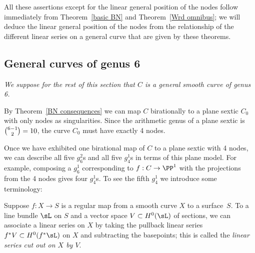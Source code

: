All these assertions except for the linear general position of the nodes
follow immediately from
Theorem~\ref{basic BN} and
Theorem~\ref{Wrd omnibus}; we will deduce the linear general position
of the nodes from the relationship of the different
linear series on a general curve that are given by these theorems.

\subsection{General curves of genus 6}
\emph{We suppose for the rest of this section that $C$ is a general
smooth curve of genus 6.}

By Theorem~\ref{BN consequences} we can map $C$ birationally to a plane
sextic $C_0$ with only nodes as singularities. Since the arithmetic genus
of a plane sextic is $\tbinom{6-1}{2} = 10$, the curve $C_{0}$
must have exactly 4 nodes.

Once we have exhibited one birational map of $C$ to a plane sextic with
4 nodes, we can describe all five $g^2_6$s and all five $g^1_4$s in terms
of this plane model. For example, composing a $g^1_6$ corresponding to $f:
C\to \PP^1$ with the projections from the 4 nodes gives four $g^1_4$s. To
see the
fifth
%
%
$g^{1}_{4}$ we introduce some terminology:

Suppose $f : X \to S$ is a regular map from a smooth curve $X$ to a
surface~$S$. 
To a line bundle $\sL$ on $S$ and a vector space $V \subset H^0(\sL)$ 
of sections, we can associate a linear series
on $X$ by taking the pullback linear series $f^*V \subset H^0(f^*\sL )$
on $X$ and subtracting the basepoints; this is called the
\emph{linear series cut out on $X$ by $V$}.
%

